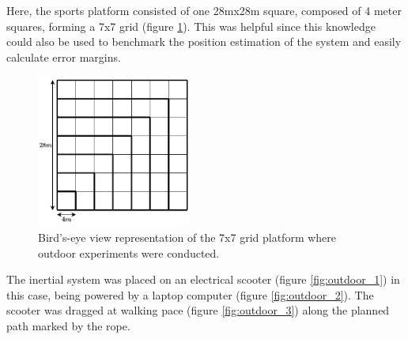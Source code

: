 Here, the sports platform consisted of one 28mx28m square, composed of 4 meter squares, forming a 7x7 grid (figure \ref{fig:platform_representation}). This was helpful since this knowledge could also be used to benchmark the position estimation of the system and easily calculate error margins.

\begin{figure}[!h]
  \centering
  \includegraphics[width=0.45\textwidth]{figures/square.pdf}
  \caption{ Bird's-eye view representation of the 7x7 grid platform where outdoor experiments were conducted. }
  \label{fig:platform_representation}
\end{figure}





The inertial system was placed on an electrical scooter (figure \ref{fig:outdoor_1}) in this case, being powered by a laptop computer (figure \ref{fig:outdoor_2}). The scooter was dragged at walking pace (figure \ref{fig:outdoor_3}) along the planned path marked by the rope.

